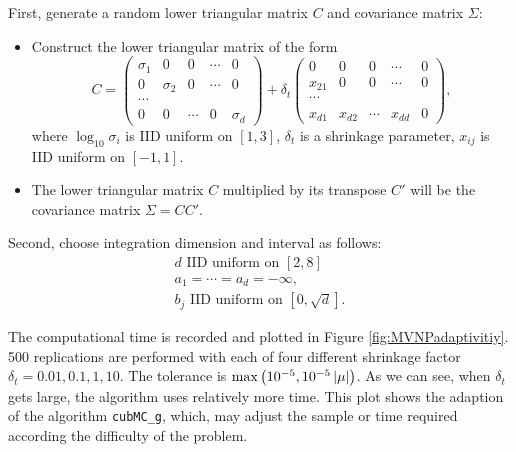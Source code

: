 \documentclass{iitthesis}
\theoremstyle{definition}
\begin{document}
First, generate a random lower triangular matrix $C$ and covariance matrix $\Sigma$:
\begin{itemize}
\item Construct the lower triangular matrix of the form
\begin{equation}\label{lowertrimatrixC}
C = \left (\begin{array}{ccccc}
\sigma_1&0&0&\cdots&0\\
0&\sigma_2&0& \cdots &0 \\
\cdots\\
0&0&\cdots&0&\sigma_d \end{array}\right)+\delta_t  \left (\begin{array}{ccccc}
0&0&0&\cdots&0\\
x_{21}&0&0& \cdots &0 \\
\cdots\\
x_{d1}&x_{d2}&\cdots&x_{dd}&0 \end{array}\right), 
\end{equation}
where $\log_{10}\sigma_i$ is IID uniform on $[1,3]$, $\delta_t$ is a shrinkage parameter, $x_{ij}$ is IID uniform on $[-1,1]$.
\item The lower triangular matrix $C$ multiplied by its transpose $C'$ will be the covariance matrix $\Sigma = CC'$.
\end{itemize}

Second, choose integration dimension and interval as follows:
\begin{subequations} \label{MVNPexp2param}
\begin{gather}
d \text{ IID uniform on } [2,8] \\
a_1=\cdots=a_d =-\infty,\\
b_j \text{ IID uniform on } \left[0,\sqrt{d} \right].
\end{gather}
\end{subequations}

The computational time is recorded and plotted in Figure \ref{fig:MVNPadaptivitiy}. 500 replications are performed with each of four different shrinkage factor $\delta_t =  0.01,0.1, 1, 10$. The tolerance is $ \max \left(10^{-5}, 10^{-5}\left \lvert \mu \right \rvert\right)$. As we can see, when $\delta_t$ gets large, the algorithm uses relatively more time. This plot shows the adaption of the algorithm {\tt cubMC\_g}, which, may adjust the sample or time required according the difficulty of the problem.


\label{chapter:meanMCberg}
\end{document}
